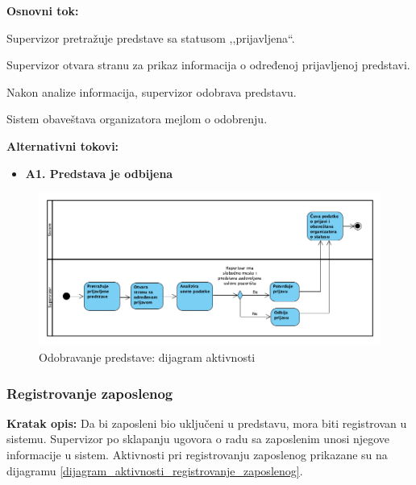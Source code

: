 \documentclass[a4paper]{article}
\begin{document}
\noindent\textbf{Osnovni tok:}
  \begin{legal}
    \item Supervizor pretražuje predstave sa statusom ,,prijavljena``.
    \item Supervizor otvara stranu za prikaz informacija o određenoj prijavljenoj predstavi. 
    \item Nakon analize informacija, supervizor odobrava predstavu. 
    \item Sistem obaveštava organizatora mejlom o odobrenju. 
  \end{legal}

\noindent\textbf{Alternativni tokovi:} 
\begin{itemize}
  \item \textbf{A1. Predstava je odbijena} 
\end{itemize}

\begin{figure}[H]
  \begin{center}
      \includegraphics[width=160mm]{../images/dijagram_aktivnosti_odobravanje_predstave.png}
  \end{center}
  \caption{Odobravanje predstave: dijagram aktivnosti}
  \label{dijagram_aktivnosti_odobravanje_predstave}
\end{figure}

\subsubsection{Registrovanje zaposlenog} \label{Registrovanje zaposlenih}
\noindent\textbf{Kratak opis:} Da bi zaposleni bio uključeni u predstavu, mora biti registrovan u sistemu. Supervizor po sklapanju ugovora o radu sa zaposlenim unosi njegove informacije u sistem. Aktivnosti pri registrovanju zaposlenog prikazane su na dijagramu \ref{dijagram_aktivnosti_registrovanje_zaposlenog}.
\end{document}
